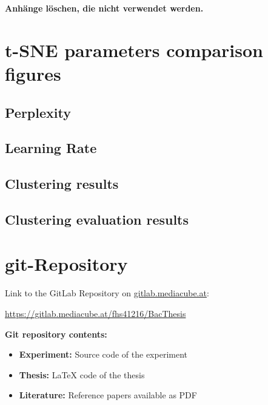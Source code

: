 \begin{appendices}
\textbf{\color{red} Anhänge löschen, die nicht verwendet werden.}

\section{t-SNE parameters comparison figures}
\label{appendix:tSNEParameters}
\subsection{Perplexity}
\label{appendix:tSNEParametersPerplexity}
% 

\subsection{Learning Rate}
\label{appendix:tSNEParametersLearningRate}
% 


\subsection{Clustering results}
\label{appendix:clusteringResults}
% 
% 

\subsection{Clustering evaluation results}
\label{appendix:clusteringEvaluationResults}
% 









\section{git-Repository}



Link to the GitLab Repository on {\url{gitlab.mediacube.at}}:

{\color{red}\url{https://gitlab.mediacube.at/fhs41216/BacThesis}}

\textbf{Git repository contents:}

\begin{itemize}
	\item \textbf{Experiment:} Source code of the experiment
	\item \textbf{Thesis:} LaTeX code of the thesis
	\item \textbf{Literature:} Reference papers available as PDF
\end{itemize}




\end{appendices}
